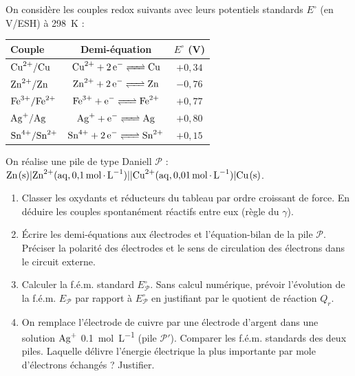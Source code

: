 \documentclass[11pt]{article}
\begin{document}
\begin{exercice}
On considère les couples redox suivants avec leurs potentiels standards $E^\circ$ (en V/ESH) à \SI{298}{K} :
\begin{center}
\begin{tabular}{lcc}
\toprule
Couple & Demi-équation & $E^\circ$ (V) \\
\midrule
$\ce{Cu^{2+}/Cu}$ & $\ce{Cu^{2+} + 2e- <=> Cu}$ & $+0,34$ \\
$\ce{Zn^{2+}/Zn}$ & $\ce{Zn^{2+} + 2e- <=> Zn}$ & $-0,76$ \\
$\ce{Fe^{3+}/Fe^{2+}}$ & $\ce{Fe^{3+} + e- <=> Fe^{2+}}$ & $+0,77$ \\
$\ce{Ag+/Ag}$ & $\ce{Ag+ + e- <=> Ag}$ & $+0,80$ \\
$\ce{Sn^{4+}/Sn^{2+}}$ & $\ce{Sn^{4+} + 2e- <=> Sn^{2+}}$ & $+0,15$ \\
\bottomrule
\end{tabular}
\end{center}
On réalise une pile de type Daniell $\mathcal{P}$ : $\ce{Zn(s)} | \ce{Zn^{2+}(aq, 0,1 mol.L^{-1})} || \ce{Cu^{2+}(aq, 0,01 mol.L^{-1})} | \ce{Cu(s)}$.
\begin{enumerate}
    \item Classer les oxydants et réducteurs du tableau par ordre croissant de force. En déduire les couples spontanément réactifs entre eux (règle du $\gamma$).
    \item Écrire les demi-équations aux électrodes et l'équation-bilan de la pile $\mathcal{P}$. Préciser la polarité des électrodes et le sens de circulation des électrons dans le circuit externe.
    \item Calculer la f.é.m. standard $E^\circ_{\mathcal{P}}$. Sans calcul numérique, prévoir l'évolution de la f.é.m. $E_{\mathcal{P}}$ par rapport à $E^\circ_{\mathcal{P}}$ en justifiant par le quotient de réaction $Q_r$. 
    \item On remplace l'électrode de cuivre par une électrode d'argent dans une solution $\ce{Ag+}$ \SI{0,1}{mol.L^{-1}} (pile $\mathcal{P}'$). Comparer les f.é.m. standards des deux piles. Laquelle délivre l'énergie électrique la plus importante par mole d'électrons échangés ? Justifier.
\end{enumerate}
\end{exercice}
\end{document}
